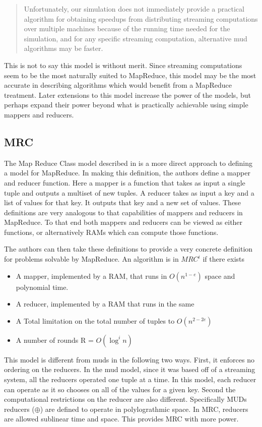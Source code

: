 \documentclass{article}
\begin{document}
\begin{quotation}
Unfortunately, our simulation does not immediately provide a practical algorithm for obtaining speedups from distributing streaming computations over multiple machines because of the running time needed for the simulation, and for any specific streaming computation, alternative mud algorithms may be faster. \cite{mud}
\end{quotation}

This is not to say this model is without merit. Since streaming computations seem to be the most naturally suited to MapReduce, this model may be the most accurate in describing algorithms which would benefit from a MapReduce treatment. Later extensions to this model increase the power of the models, but perhaps expand their power beyond what is practically achievable using simple mappers and reducers. 

\subsection{MRC}
The Map Reduce Class model described in \cite{mrc} is a more direct approach to defining a model for MapReduce. In making this definition, the authors define a mapper and reducer function. Here a mapper is a function that takes as input a single tuple and outputs a multiset of new tuples. A reducer takes as input a key and a list of values for that key. It outputs that key and a new set of values. These definitions are very analogous to that capabilities of mappers and reducers in MapReduce. To that end both mappers and reducers can be viewed as either functions, or alternatively RAMs which can compute those functions. 

The authors can then take these definitions to provide a very concrete definition for problems solvable by MapReduce. An algorithm is in $MRC^i$ if there exists 
\begin{itemize}
\item A mapper, implemented by a RAM, that runs in $O(n^{1-e})$ space and polynomial time. 
\item A reducer, implemented by a RAM that runs in the same
\item A Total limitation on the total number of tuples to $O(n^{2-2e})$ 
\item A number of rounds R = $O(\log^i n)$
\end{itemize}

This model is different from muds in the following two ways. First, it enforces no ordering on the reducers. In the mud model, since it was based off of a streaming system, all the reducers operated one tuple at a time. In this model, each reducer can operate as it so chooses on all of the values for a given key. Second the computational restrictions on the reducer are also different. Specifically MUDs reducers ($\oplus$) are defined to operate in polylograthmic space. In MRC, reducers are allowed sublinear time and space. This provides MRC with more power. 
\end{document}
